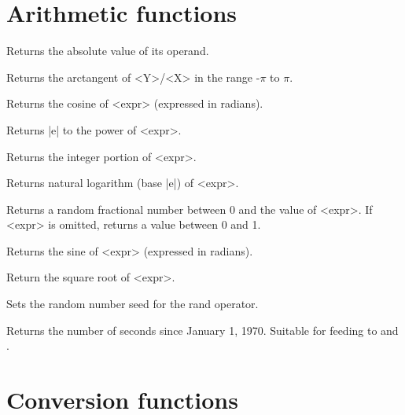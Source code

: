 \section{Arithmetic functions} 

\begin{enum}{1cm}

Returns the absolute value of its operand.

Returns the arctangent of <Y>/<X> in the range -$\pi$ to $\pi$.

Returns the cosine of <expr> (expressed in radians).

Returns |e| to the power of <expr>.

Returns the integer portion of <expr>.

Returns natural logarithm (base |e|) of <expr>.

Returns a random fractional number between 0 and the value of <expr>.
If <expr> is omitted, returns a value between 0 and 1. 

Returns the sine of <expr> (expressed in radians).

Return the square root of <expr>.

Sets the random number seed for the rand operator.

Returns the number of seconds since January 1, 1970. Suitable for
feeding to  and . 

\end{enum}


\section{Conversion functions} 


